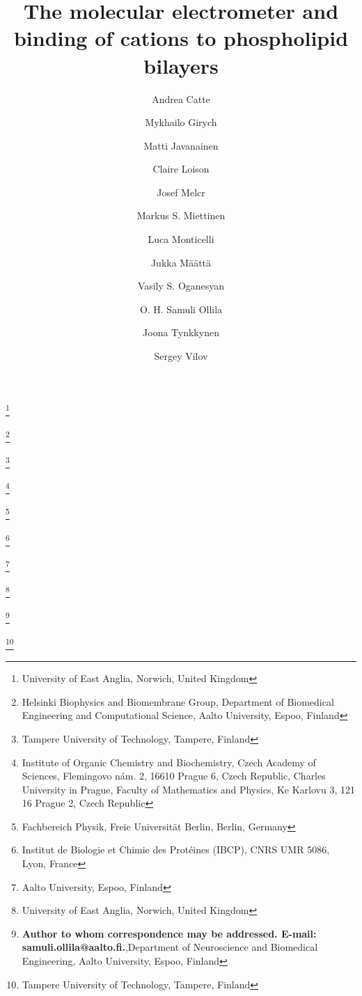 \documentclass[pre,aps,floatfix,authordate1-4,twocolumn]{revtex4-1}
\begin{document}

\title{The molecular electrometer and binding of cations to phospholipid bilayers}

\author{Andrea Catte}
\thanks{University of East Anglia, Norwich, United Kingdom}
\author{Mykhailo Girych}
\thanks{Helsinki Biophysics and Biomembrane Group, Department of Biomedical Engineering and Computational Science, Aalto University, Espoo, Finland}
\author{Matti Javanainen}
\thanks{Tampere University of Technology, Tampere, Finland}
\author{Claire Loison}
\author{Josef Melcr}
\thanks{Institute of Organic Chemistry and Biochemistry, Czech Academy of Sciences, Flemingovo nám. 2, 16610 Prague 6, Czech Republic,
Charles University in Prague, Faculty of Mathematics and Physics, Ke Karlovu 3, 121 16 Prague 2, Czech Republic}
\author{Markus S. Miettinen}
\thanks{Fachbereich Physik, Freie Universit\"at Berlin, Berlin, Germany}
\author{Luca Monticelli}
\thanks{Institut de Biologie et Chimie des Prot{\'e}ines (IBCP), CNRS UMR 5086, Lyon, France}
\author{Jukka M{\"a}{\"a}tt{\"a}}
\thanks{Aalto University, Espoo, Finland}
\author{Vasily S. Oganesyan}
\thanks{University of East Anglia, Norwich, United Kingdom}
\author{O. H. Samuli Ollila} 
\thanks{{\bf Author to whom correspondence may be addressed. E-mail: samuli.ollila@aalto.fi.},Department of Neuroscience and Biomedical Engineering, Aalto University, Espoo, Finland}
\author{Joona Tynkkynen}
\thanks{Tampere University of Technology, Tampere, Finland}
\author{Sergey Vilov}
\end{document}

